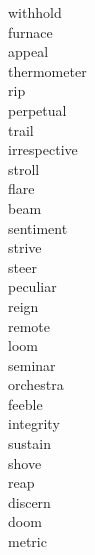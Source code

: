 \documentclass[b5paper, 11pt]{ctexart}
\begin{document}
\begin{multicols*}{3}
\begin{description}
\item[withhold]

\item[furnace]

\item[appeal]

\item[thermometer]

\item[rip]

\item[perpetual]

\item[trail]

\item[irrespective]

\item[stroll]

\item[flare]

\item[beam]

\item[sentiment]

\item[strive]

\item[steer]

\item[peculiar]

\item[reign]

\item[remote]

\item[loom]

\item[seminar]

\item[orchestra]

\item[feeble]

\item[integrity]

\item[sustain]

\item[shove]

\item[reap]

\item[discern]

\item[doom]

\item[metric]


\end{description}
\end{multicols*}
\end{document}
